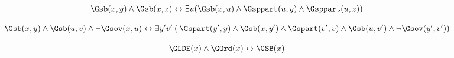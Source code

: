\begin{erin}
    \begin{align*}
        \Gsb(x,y) \wedge \Gsb(x,z) \leftrightarrow \exists u (\Gsb(x,u) \land \Gsppart(u,y) \land \Gsppart(u,z))
    \end{align*}
\end{erin}

\begin{erin}[A32'.]
    \begin{align*}
        \Gsb(x,y) \land \Gsb(u,v) \land \neg \Gsov(x,u) \leftrightarrow \exists y'v'\:(\: \Gspart(y',y) \land \Gsb(x,y') \land \Gspart(v',v) \land \Gsb(u,v') \land \neg \Gsov(y',v'))
    \end{align*}
\end{erin}

\begin{erin}
    \begin{align*}
        \GLDE(x) \land \GOrd(x) \leftrightarrow \GSB(x)
    \end{align*}
\end{erin}
